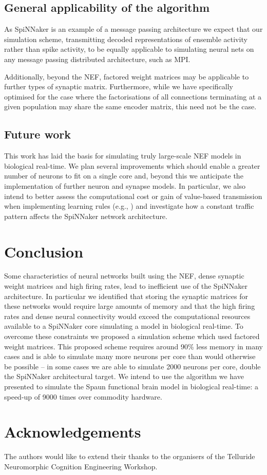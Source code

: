 \documentclass[conference]{IEEEtran}
\begin{document}
  \subsection{General applicability of the algorithm}

  As SpiNNaker is an example of a message passing architecture we expect that our simulation scheme, transmitting decoded representations of ensemble activity rather than spike activity, to be equally applicable to simulating neural nets on any message passing distributed architecture, such as MPI.

  Additionally, beyond the NEF, factored weight matrices may be applicable to further types of synaptic matrix.
  Furthermore, while we have specifically optimised for the case where the factorisations of all connections terminating at a given population may share the same encoder matrix, this need not be the case.

  \subsection{Future work}

  This work has laid the basis for simulating truly large-scale NEF models in biological real-time.
  We plan several improvements which should enable a greater number of neurons to fit on a single core and, beyond this we anticipate the implementation of further neuron and synapse models.
  In particular, we also intend to better assess the computational cost or gain of value-based transmission when implementing learning rules (e.g., \parencite{Voelker2014}) and investigate how a constant traffic pattern affects the SpiNNaker network architecture.

  \section{Conclusion}

  Some characteristics of neural networks built using the NEF, dense synaptic weight matrices and high firing rates, lead to inefficient use of the SpiNNaker architecture.
  In particular we identified that storing the synaptic matrices for these networks would require large amounts of memory and that the high firing rates and dense neural connectivity would exceed the computational resources available to a SpiNNaker core simulating a model in biological real-time.
  To overcome these constraints we proposed a simulation scheme which used factored weight matrices.
  This proposed scheme requires around 90\% less memory in many cases and is able to simulate many more neurons per core than would otherwise be possible -- in some cases we are able to simulate 2000 neurons per core, double the SpiNNaker architectural target.
  We intend to use the algorithm we have presented to simulate the Spaun functional brain model in biological real-time: a speed-up of 9000 times over commodity hardware.

  \section*{Acknowledgements}

The authors would like to extend their thanks to the organisers of the Telluride Neuromorphic Cognition Engineering Workshop.

  \printbibliography
\end{document}
